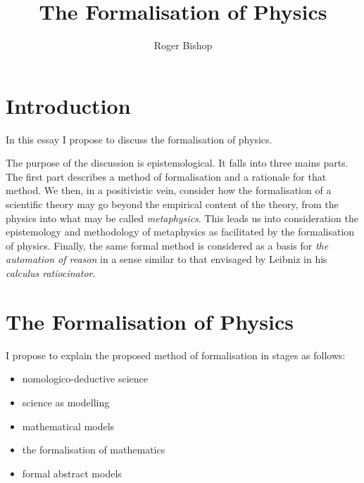 \documentclass{rbjk}
\begin{document}
                                                                                   
\begin{article}
\begin{opening}  
\title{The Formalisation of Physics}
\author{Roger Bishop }

\begin{abstract}

\end{abstract}
\end{opening}

\setcounter{tocdepth}{4}
{\parskip-0pt\tableofcontents}

\section{Introduction}

In this essay I propose to discuss the formalisation of physics.

The purpose of the discussion is epistemological.
It falls into three mains parts.
The first part describes a method of formalisation and a rationale for that method.
We then, in a positivistic vein, consider how the formalisation of a scientific theory may go beyond the empirical content of the theory, from the physics into what may be called {\it metaphysics}.
This leads us into consideration the epistemology and methodology of metaphysics as facilitated by the formalisation of physics.
Finally, the same formal method is considered as a basis for {\it the automation of reason} in a sense similar to that envisaged by Leibniz in his {\it calculus ratiocinator}.

\section{The Formalisation of Physics}

I propose to explain the proposed method of formalisation in stages as follows:

\begin{itemize}
\item nomologico-deductive science
\item science as modelling
\item mathematical models
\item the formalisation of mathematics
\item formal abstract models
\end{itemize}


\end{article}
\end{document}
